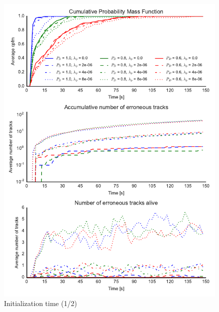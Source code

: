 \begin{figure}
\centering
\includegraphics{Figures/plots/Scenario1_Init-Time(1-2).pdf}
\caption{Initialization time (1/2)}\label{fig:init_time_1-2}
\end{figure}

